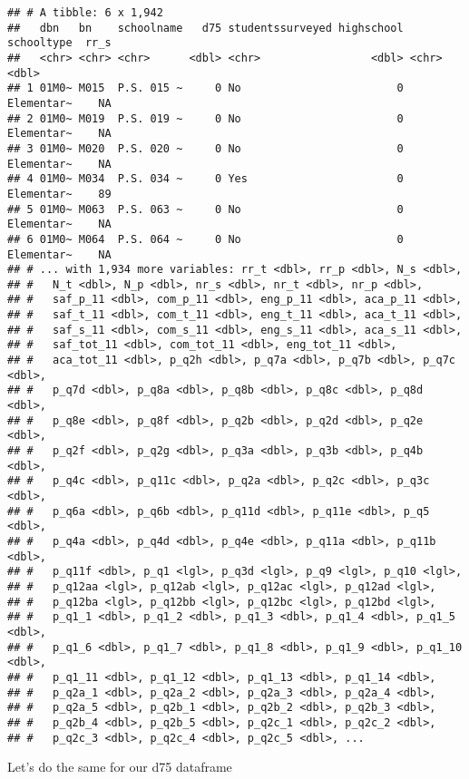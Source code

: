 \documentclass[]{article}
\begin{document}
\begin{verbatim}
## # A tibble: 6 x 1,942
##   dbn   bn    schoolname   d75 studentssurveyed highschool schooltype  rr_s
##   <chr> <chr> <chr>      <dbl> <chr>                 <dbl> <chr>      <dbl>
## 1 01M0~ M015  P.S. 015 ~     0 No                        0 Elementar~    NA
## 2 01M0~ M019  P.S. 019 ~     0 No                        0 Elementar~    NA
## 3 01M0~ M020  P.S. 020 ~     0 No                        0 Elementar~    NA
## 4 01M0~ M034  P.S. 034 ~     0 Yes                       0 Elementar~    89
## 5 01M0~ M063  P.S. 063 ~     0 No                        0 Elementar~    NA
## 6 01M0~ M064  P.S. 064 ~     0 No                        0 Elementar~    NA
## # ... with 1,934 more variables: rr_t <dbl>, rr_p <dbl>, N_s <dbl>,
## #   N_t <dbl>, N_p <dbl>, nr_s <dbl>, nr_t <dbl>, nr_p <dbl>,
## #   saf_p_11 <dbl>, com_p_11 <dbl>, eng_p_11 <dbl>, aca_p_11 <dbl>,
## #   saf_t_11 <dbl>, com_t_11 <dbl>, eng_t_11 <dbl>, aca_t_11 <dbl>,
## #   saf_s_11 <dbl>, com_s_11 <dbl>, eng_s_11 <dbl>, aca_s_11 <dbl>,
## #   saf_tot_11 <dbl>, com_tot_11 <dbl>, eng_tot_11 <dbl>,
## #   aca_tot_11 <dbl>, p_q2h <dbl>, p_q7a <dbl>, p_q7b <dbl>, p_q7c <dbl>,
## #   p_q7d <dbl>, p_q8a <dbl>, p_q8b <dbl>, p_q8c <dbl>, p_q8d <dbl>,
## #   p_q8e <dbl>, p_q8f <dbl>, p_q2b <dbl>, p_q2d <dbl>, p_q2e <dbl>,
## #   p_q2f <dbl>, p_q2g <dbl>, p_q3a <dbl>, p_q3b <dbl>, p_q4b <dbl>,
## #   p_q4c <dbl>, p_q11c <dbl>, p_q2a <dbl>, p_q2c <dbl>, p_q3c <dbl>,
## #   p_q6a <dbl>, p_q6b <dbl>, p_q11d <dbl>, p_q11e <dbl>, p_q5 <dbl>,
## #   p_q4a <dbl>, p_q4d <dbl>, p_q4e <dbl>, p_q11a <dbl>, p_q11b <dbl>,
## #   p_q11f <dbl>, p_q1 <lgl>, p_q3d <lgl>, p_q9 <lgl>, p_q10 <lgl>,
## #   p_q12aa <lgl>, p_q12ab <lgl>, p_q12ac <lgl>, p_q12ad <lgl>,
## #   p_q12ba <lgl>, p_q12bb <lgl>, p_q12bc <lgl>, p_q12bd <lgl>,
## #   p_q1_1 <dbl>, p_q1_2 <dbl>, p_q1_3 <dbl>, p_q1_4 <dbl>, p_q1_5 <dbl>,
## #   p_q1_6 <dbl>, p_q1_7 <dbl>, p_q1_8 <dbl>, p_q1_9 <dbl>, p_q1_10 <dbl>,
## #   p_q1_11 <dbl>, p_q1_12 <dbl>, p_q1_13 <dbl>, p_q1_14 <dbl>,
## #   p_q2a_1 <dbl>, p_q2a_2 <dbl>, p_q2a_3 <dbl>, p_q2a_4 <dbl>,
## #   p_q2a_5 <dbl>, p_q2b_1 <dbl>, p_q2b_2 <dbl>, p_q2b_3 <dbl>,
## #   p_q2b_4 <dbl>, p_q2b_5 <dbl>, p_q2c_1 <dbl>, p_q2c_2 <dbl>,
## #   p_q2c_3 <dbl>, p_q2c_4 <dbl>, p_q2c_5 <dbl>, ...
\end{verbatim}

Let's do the same for our d75 dataframe
\end{document}
